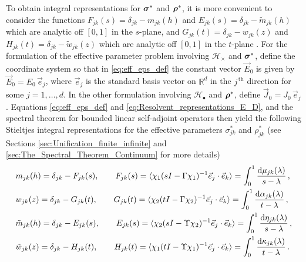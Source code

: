 \documentclass{cmslatex}
\renewcommand{\d}{\text{d}}
\newcommand\bsig{\mbox{\boldmath${\sigma}$}}
\newcommand\brho{\mbox{\boldmath${\rho}$}}
\begin{document}
To obtain integral representations for $\bsig^*$ and
$\brho^*$, it is more convenient to consider the functions 
$F_{jk}(s)=\delta_{jk}-m_{jk}(h)$ and $E_{jk}(s)=\delta_{jk}-\tilde{m}_{jk}(h)$
which are analytic off $[0,1]$ in the $s$-plane, and
$G_{jk}(t)=\delta_{jk}-w_{jk}(z)$ and $H_{jk}(t)=\delta_{jk}-\tilde{w}_{jk}(z)$
which are analytic off $[0,1]$ in the $t$-plane
\cite{Golden:CMP-473}. For the formulation of the effective parameter
problem involving $\mathscr{H}_\times$ and $\bsig^*$, define the
coordinate system so that in \eqref{eq:eff_eps_def} the constant
vector $\vec{E}_0$ is given by $\vec{E}_0=E_0\,\vec{e}_j$, where
$\vec{e}_j$ is the standard basis vector on $\mathbb{R}^d$ in the
$j^{\,\text{th}}$ direction for some $j=1,\ldots,d$. In the other
formulation involving $\mathscr{H}_\bullet$ and $\brho^*$, define
$\vec{J}_0=J_0\,\vec{e}_j$. Equations \eqref{eq:eff_eps_def} and 
\eqref{eq:Resolvent_representations_E_D}, and the spectral theorem for
bounded linear self-adjoint operators \cite{Reed-1980,Stone:64} then
yield the following Stieltjes integral representations
\cite{Golden:CMP-473,Bergman:PRC-377,Bergman:AP-78,Murphy:JMP:063506}  
for the effective parameters $\sigma^*_{jk}$ and $\rho^*_{jk}$ (see Sections
\ref{sec:Unification_finite_infinite} and
\ref{sec:The_Spectral_Theorem_Continuum} for more details) 
%
\begin{align}\label{eq:Stieltjes_F}
  &m_{jk}(h)=\delta_{jk}-F_{jk}(s), \qquad
  F_{jk}(s)=\langle\chi_1(sI-\Gamma\chi_1)^{-1}\vec{e}_j\cdot\vec{e}_k\rangle=\int_0^1\frac{\d\mu_{jk}(\lambda)}{s-\lambda}\,,
  \\
  &w_{jk}(z)=\delta_{jk}-G_{jk}(t), \qquad
  G_{jk}(t)=\langle\chi_2(tI-\Gamma\chi_2)^{-1}\vec{e}_j\cdot\vec{e}_k\rangle=\int_0^1\frac{\d\alpha_{jk}(\lambda)}{t-\lambda}\,,
  \notag \\
  &\tilde{m}_{jk}(h)=\delta_{jk}-E_{jk}(s), \qquad
  E_{jk}(s)=\langle\chi_2(sI-\Upsilon\chi_2)^{-1}\vec{e}_j\cdot\vec{e}_k\rangle=\int_0^1\frac{\d\eta_{jk}(\lambda)}{s-\lambda}\,,
  \notag \\
  &\tilde{w}_{jk}(z)=\delta_{jk}-H_{jk}(t), \qquad
  H_{jk}(t)=\langle\chi_1(tI-\Upsilon\chi_1)^{-1}\vec{e}_j\cdot\vec{e}_k\rangle=\int_0^1\frac{\d\kappa_{jk}(\lambda)}{t-\lambda}\,.
  \notag
\end{align}
%
\end{document}
